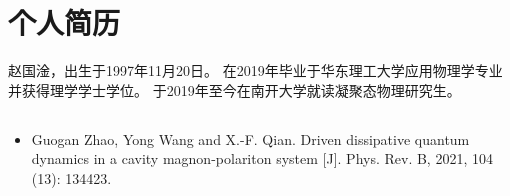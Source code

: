 
\chapter*{个人简历}


{
	\fontsize{10.5bp}{16bp}\selectfont
	赵国淦，出生于1997年11月20日。
	在2019年毕业于华东理工大学应用物理学专业并获得理学学士学位。
	于2019年至今在南开大学就读凝聚态物理研究生。
}


\section*{}

\begin{itemize}
	\fontsize{10.5bp}{16bp}\selectfont
	\item Guogan Zhao, Yong Wang and X.-F. Qian. Driven dissipative quantum dynamics in a cavity magnon-polariton system [J]. Phys. Rev. B, 2021, 104 (13): 134423.
\end{itemize}




